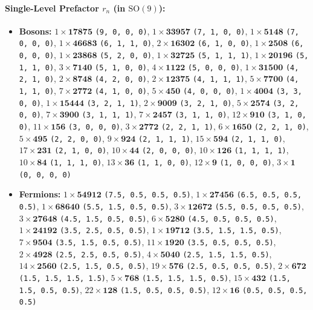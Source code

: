\documentclass[11pt,a4paper]{article}
\begin{document}
\paragraph{Single-Level Prefactor $r_n$ (in $\mathrm{SO}(9)$):}
\begin{itemize}
    \item \textbf{Bosons:} $1 \times \mathbf{17875}$ \texttt{(9, 0, 0, 0)}, $1 \times \mathbf{33957}$ \texttt{(7, 1, 0, 0)}, $1 \times \mathbf{5148}$ \texttt{(7, 0, 0, 0)}, $1 \times \mathbf{46683}$ \texttt{(6, 1, 1, 0)}, $2 \times \mathbf{16302}$ \texttt{(6, 1, 0, 0)}, $1 \times \mathbf{2508}$ \texttt{(6, 0, 0, 0)}, $1 \times \mathbf{23868}$ \texttt{(5, 2, 0, 0)}, $1 \times \mathbf{32725}$ \texttt{(5, 1, 1, 1)}, $1 \times \mathbf{20196}$ \texttt{(5, 1, 1, 0)}, $3 \times \mathbf{7140}$ \texttt{(5, 1, 0, 0)}, $4 \times \mathbf{1122}$ \texttt{(5, 0, 0, 0)}, $1 \times \mathbf{31500}$ \texttt{(4, 2, 1, 0)}, $2 \times \mathbf{8748}$ \texttt{(4, 2, 0, 0)}, $2 \times \mathbf{12375}$ \texttt{(4, 1, 1, 1)}, $5 \times \mathbf{7700}$ \texttt{(4, 1, 1, 0)}, $7 \times \mathbf{2772}$ \texttt{(4, 1, 0, 0)}, $5 \times \mathbf{450}$ \texttt{(4, 0, 0, 0)}, $1 \times \mathbf{4004}$ \texttt{(3, 3, 0, 0)}, $1 \times \mathbf{15444}$ \texttt{(3, 2, 1, 1)}, $2 \times \mathbf{9009}$ \texttt{(3, 2, 1, 0)}, $5 \times \mathbf{2574}$ \texttt{(3, 2, 0, 0)}, $7 \times \mathbf{3900}$ \texttt{(3, 1, 1, 1)}, $7 \times \mathbf{2457}$ \texttt{(3, 1, 1, 0)}, $12 \times \mathbf{910}$ \texttt{(3, 1, 0, 0)}, $11 \times \mathbf{156}$ \texttt{(3, 0, 0, 0)}, $3 \times \mathbf{2772}$ \texttt{(2, 2, 1, 1)}, $6 \times \mathbf{1650}$ \texttt{(2, 2, 1, 0)}, $5 \times \mathbf{495}$ \texttt{(2, 2, 0, 0)}, $9 \times \mathbf{924}$ \texttt{(2, 1, 1, 1)}, $15 \times \mathbf{594}$ \texttt{(2, 1, 1, 0)}, $17 \times \mathbf{231}$ \texttt{(2, 1, 0, 0)}, $10 \times \mathbf{44}$ \texttt{(2, 0, 0, 0)}, $10 \times \mathbf{126}$ \texttt{(1, 1, 1, 1)}, $10 \times \mathbf{84}$ \texttt{(1, 1, 1, 0)}, $13 \times \mathbf{36}$ \texttt{(1, 1, 0, 0)}, $12 \times \mathbf{9}$ \texttt{(1, 0, 0, 0)}, $3 \times \mathbf{1}$ \texttt{(0, 0, 0, 0)}
    \item \textbf{Fermions:} $1 \times \mathbf{54912}$ \texttt{(7.5, 0.5, 0.5, 0.5)}, $1 \times \mathbf{27456}$ \texttt{(6.5, 0.5, 0.5, 0.5)}, $1 \times \mathbf{68640}$ \texttt{(5.5, 1.5, 0.5, 0.5)}, $3 \times \mathbf{12672}$ \texttt{(5.5, 0.5, 0.5, 0.5)}, $3 \times \mathbf{27648}$ \texttt{(4.5, 1.5, 0.5, 0.5)}, $6 \times \mathbf{5280}$ \texttt{(4.5, 0.5, 0.5, 0.5)}, $1 \times \mathbf{24192}$ \texttt{(3.5, 2.5, 0.5, 0.5)}, $1 \times \mathbf{19712}$ \texttt{(3.5, 1.5, 1.5, 0.5)}, $7 \times \mathbf{9504}$ \texttt{(3.5, 1.5, 0.5, 0.5)}, $11 \times \mathbf{1920}$ \texttt{(3.5, 0.5, 0.5, 0.5)}, $2 \times \mathbf{4928}$ \texttt{(2.5, 2.5, 0.5, 0.5)}, $4 \times \mathbf{5040}$ \texttt{(2.5, 1.5, 1.5, 0.5)}, $14 \times \mathbf{2560}$ \texttt{(2.5, 1.5, 0.5, 0.5)}, $19 \times \mathbf{576}$ \texttt{(2.5, 0.5, 0.5, 0.5)}, $2 \times \mathbf{672}$ \texttt{(1.5, 1.5, 1.5, 1.5)}, $5 \times \mathbf{768}$ \texttt{(1.5, 1.5, 1.5, 0.5)}, $15 \times \mathbf{432}$ \texttt{(1.5, 1.5, 0.5, 0.5)}, $22 \times \mathbf{128}$ \texttt{(1.5, 0.5, 0.5, 0.5)}, $12 \times \mathbf{16}$ \texttt{(0.5, 0.5, 0.5, 0.5)}
\end{itemize}
\end{document}

